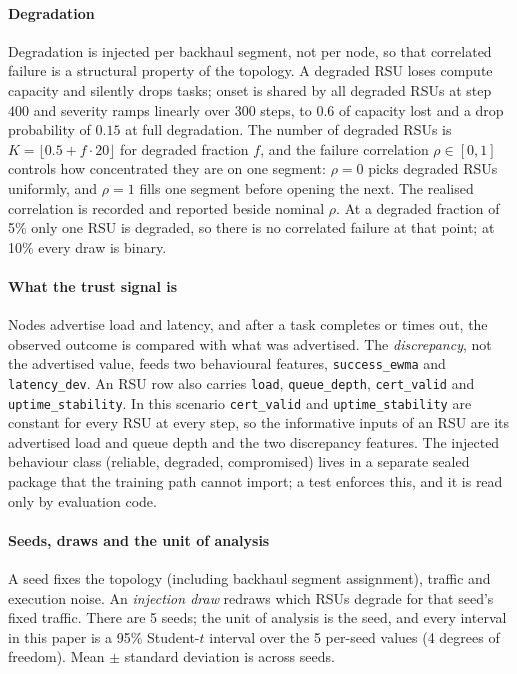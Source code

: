 \paragraph*{Degradation}
Degradation is injected per backhaul segment, not per node, so that correlated failure is a structural property of the topology.
A degraded RSU loses compute capacity and silently drops tasks; onset is shared by all degraded RSUs at step $400$ and severity ramps linearly over $300$ steps, to $0.6$ of capacity lost and a drop probability of $0.15$ at full degradation.
The number of degraded RSUs is $K=\lfloor 0.5+f\cdot 20\rfloor$ for degraded fraction $f$, and the failure correlation $\rho\in[0,1]$ controls how concentrated they are on one segment: $\rho=0$ picks degraded RSUs uniformly, and $\rho=1$ fills one segment before opening the next.
The realised correlation is recorded and reported beside nominal $\rho$.
At a degraded fraction of 5\% only one RSU is degraded, so there is no correlated failure at that point; at 10\% every draw is binary.

\paragraph*{What the trust signal is}
Nodes advertise load and latency, and after a task completes or times out, the observed outcome is compared with what was advertised.
The \emph{discrepancy}, not the advertised value, feeds two behavioural features, \texttt{success\_ewma} and \texttt{latency\_dev}.
An RSU row also carries \texttt{load}, \texttt{queue\_depth}, \texttt{cert\_valid} and \texttt{uptime\_stability}.
In this scenario \texttt{cert\_valid} and \texttt{uptime\_stability} are constant for every RSU at every step, so the informative inputs of an RSU are its advertised load and queue depth and the two discrepancy features.
The injected behaviour class (reliable, degraded, compromised) lives in a separate sealed package that the training path cannot import; a test enforces this, and it is read only by evaluation code.

\paragraph*{Seeds, draws and the unit of analysis}
A seed fixes the topology (including backhaul segment assignment), traffic and execution noise.
An \emph{injection draw} redraws which RSUs degrade for that seed's fixed traffic.
There are 5 seeds; the unit of analysis is the seed, and every interval in this paper is a 95\% Student-$t$ interval over the 5 per-seed values (4 degrees of freedom).
Mean $\pm$ standard deviation is across seeds.
